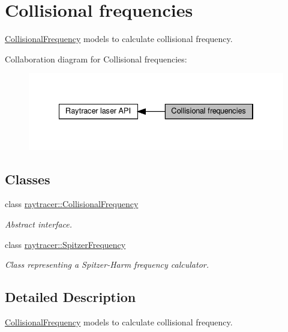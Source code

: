 \hypertarget{group__frequency}{}\section{Collisional frequencies}
\label{group__frequency}


\hyperlink{classraytracer_1_1CollisionalFrequency}{Collisional\+Frequency} models to calculate collisional frequency.  


Collaboration diagram for Collisional frequencies\+:
\nopagebreak
\begin{figure}[H]
\begin{center}
\leavevmode
\includegraphics[width=334pt]{group__frequency}
\end{center}
\end{figure}
\subsection*{Classes}
\begin{DoxyCompactItemize}
\item 
class \hyperlink{classraytracer_1_1CollisionalFrequency}{raytracer\+::\+Collisional\+Frequency}
\begin{DoxyCompactList}\small\item\em Abstract interface. \end{DoxyCompactList}\item 
class \hyperlink{classraytracer_1_1SpitzerFrequency}{raytracer\+::\+Spitzer\+Frequency}
\begin{DoxyCompactList}\small\item\em Class representing a Spitzer-\/\+Harm frequency calculator. \end{DoxyCompactList}\end{DoxyCompactItemize}


\subsection{Detailed Description}
\hyperlink{classraytracer_1_1CollisionalFrequency}{Collisional\+Frequency} models to calculate collisional frequency. 

